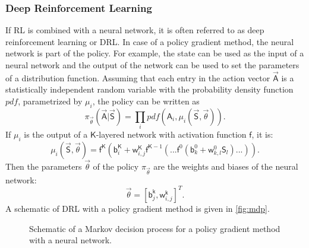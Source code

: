 \subsubsection{Deep Reinforcement Learning}
If RL is combined with a neural network, it is often referred to as deep reinforcement learning or DRL. In case of a policy gradient method, the neural network is part of the policy. For example, the state can be used as the input of a neural network and the output of the network can be used to set the parameters of a distribution function. Assuming that each entry in the action vector $\vec{\mathsf{A}}$ is a statistically independent random variable with the probability density function $pdf$, parametrized by $\mu_i$, the policy can be written as
\begin{equation}
	\pi_{\vec{\theta}}(\vec{\mathsf{A}}|\vec{\mathsf{S}}) = \prod_i pdf(\mathsf{A}_i, \mu_i(\vec{\mathsf{S}},\vec{\theta})). \label{eq:policy}
\end{equation}
If $\mu_i$ is the output of a $\mathsf{K}$-layered network with activation function $\mathsf{f}$, it is:
\begin{equation}
\mu_i(\vec{\mathsf{S}}, \vec{\theta}) = \mathsf{f}^\mathsf{\mathsf{K}} ( \mathsf{b}^\mathsf{K}_i+\mathsf{w}^\mathsf{K}_{i,j} \mathsf{f}^{\mathsf{K}-1} (...\mathsf{f}^{0}(\mathsf{b}^0_k + \mathsf{w}^0_{k,l}\mathsf{S}_l)...)). \label{eq:backprop1}
\end{equation}
Then the parameters $\vec{\theta}$ of the policy $\pi_{\vec{\theta}}$ are the weights and biases of the neural network:
\begin{equation}
	\vec{\theta} = \left[\mathsf{b}_j^\mathsf{k}, \mathsf{w}_{i,j}^\mathsf{k}\right]^T.
\end{equation}
A schematic of DRL with a policy gradient method is given in \autoref{fig:mdp}.
\begin{figure}[h]
	\centering
	\def\svgwidth{0.7 \textwidth}
	
	\caption{Schematic of a Markov decision process for a policy gradient method with a neural network.}
	\label{fig:mdp}
\end{figure}
